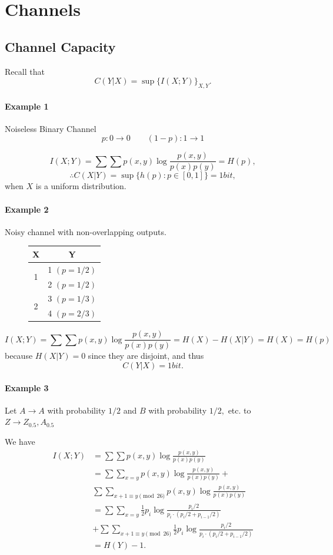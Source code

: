 \documentclass[12pt]{article}
\begin{document}
\section{Channels}
\subsection{Channel Capacity}
Recall that
\[C(Y|X)=\sup\{I(X;Y)\}_{X,Y}.\]

\paragraph{Example 1}
Noiseless Binary Channel
\[p:0\to 0\qquad (1-p):1\to 1\]

\[I(X;Y)=\sum\sum p(x,y)\log\frac{p(x,y)}{p(x)p(y)}=H(p),\]
\[\therefore C(X|Y)=\sup\{h(p):p\in[0,1]\}=1\si{bit},\]
when $X$ is a uniform distribution.

\paragraph{Example 2}
Noisy channel with non-overlapping outputs.

\begin{figure}[h!]
    \centering
    \begin{tabular}{|c|c|}
    \hline 
    X & Y \\
    \hline
     \multirow{2}{*}{1} & 1 $(p=1/2)$ \\
     \cline{2-2}
     & 2 $(p=1/2)$\\
     \hline
     \multirow{2}{*}{2} & 3 $(p=1/3)$ \\
     \cline{2-2}
     & 4 $(p=2/3)$  \\
     \hline
\end{tabular}
\end{figure}
\[I(X;Y)=\sum\sum p(x,y)\log\frac{p(x,y)}{p(x)p(y)}=H(X)-H(X|Y)=H(X)=H(p)\] because $H(X|Y)=0$ since they are disjoint, and thus
\[C(Y|X)=1\si{bit}.\]

\paragraph{Example 3}

Let $A\to A$ with probability $1/2$ and $B$ with probability $1/2,$ etc. to $Z\to Z_{0.5}, A_{0.5}$

We have
\begin{align*}
I(X;Y)&=\sum\sum p(x,y)\log\frac{p(x,y)}{p(x)p(y)}\\&=\sum\sum_{x=y}p(x,y)\log\frac{p(x,y)}{p(x)p(y)}+\\&\sum\sum_{x+1\equiv y\pmod{26}}p(x,y)\log\frac{p(x,y)}{p(x)p(y)}\\&=\sum\sum_{x=y}\frac{1}{2}p_i\log\frac{p_i/2}{p_i\cdot (p_i/2+p_{i-1}/2)}\\&+\sum\sum_{x+1\equiv y\pmod{26}}\frac{1}{2}p_i\log\frac{p_i/2}{p_i\cdot (p_i/2+p_{i-1}/2)}\\&=H(Y)-1.
\end{align*}
\end{document}
